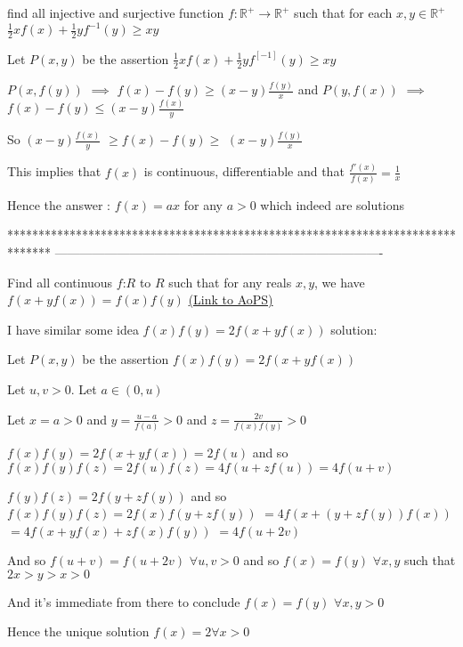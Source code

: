 \begin{solution}
	\begin{tcolorbox}find all injective and surjective function $ f:\mathbb{R}^{+}\rightarrow\mathbb{R}^{+} $ such that for each $ x,y\in\mathbb{R}^{+} $ 
                                          $\frac{1}{2}xf(x)+\frac{1}{2}yf^{-1}(y)\geq xy$\end{tcolorbox}
Let $P(x,y)$ be the assertion $\frac 12xf(x)+\frac 12yf^{[-1]}(y)\ge xy$

$P(x,f(y))$ $\implies$ $f(x)-f(y)\ge (x-y)\frac{f(y)}x$ and $P(y,f(x))$ $\implies$ $f(x)-f(y)\le (x-y)\frac{f(x)}y$

So $(x-y)\frac{f(x)}y$ $\ge f(x)-f(y)\ge$ $(x-y)\frac{f(y)}x$

This implies that $f(x)$ is continuous, differentiable and that $\frac{f'(x)}{f(x)}=\frac 1x$

Hence the answer : $\boxed{f(x)=ax}$  for any $a>0$ which indeed are solutions
\end{solution}
*******************************************************************************
-------------------------------------------------------------------------------

\begin{problem}
	Find all continuous $f$:$R$ to $R$ such that for any reals $x,y$, we have
$f(x+yf(x))=f(x)f(y)$
	\flushright \href{https://artofproblemsolving.com/community/c6h468444}{(Link to AoPS)}
\end{problem}



\begin{solution}
	I have similar some idea
$f(x)f(y)=2f(x+yf(x))$
solution:

Let $P(x,y)$ be the assertion $f(x)f(y)=2f(x+yf(x))$

Let $u,v>0$.
Let $a\in(0,u)$

Let $x=a>0$ and $y=\frac{u-a}{f(a)}>0$ and $z=\frac{2v}{f(x)f(y)}>0$

$f(x)f(y)=2f(x+yf(x))=2f(u)$ and so $f(x)f(y)f(z)=2f(u)f(z)=4f(u+zf(u))=4f(u+v)$

$f(y)f(z)=2f(y+zf(y))$ and so $f(x)f(y)f(z)=2f(x)f(y+zf(y))$ $=4f(x+(y+zf(y))f(x))$ $=4f(x+yf(x)+zf(x)f(y))$ $=4f(u+2v)$

And so $f(u+v)=f(u+2v)$ $\forall u,v>0$ and so $f(x)=f(y)$ $\forall x,y$ such that $2x>y>x>0$

And it's immediate from there to conclude $f(x)=f(y)$ $\forall x,y>0$

Hence the unique solution $\boxed{f(x)=2\forall x>0}$
\end{solution}



